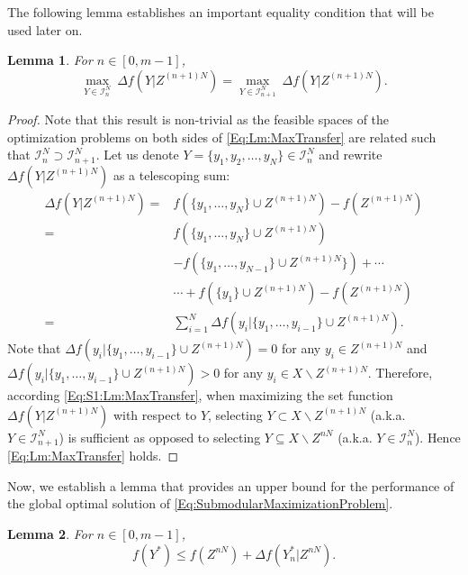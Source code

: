 \documentclass[letterpaper, 10 pt, conference]{ieeeconf}
\newtheorem{lemma}{Lemma}
\begin{document}
{%
The following lemma establishes an important equality condition that will be used later on. 
\begin{lemma}\label{Lm:MaxTransfer}
For $n\in [0,m-1]$,
\begin{equation} \label{Eq:Lm:MaxTransfer}
\underset{Y\in\mathcal{I}^N_n}{\max}\ \Delta f(Y\vert Z^{(n+1)N}) = \underset{Y\in\mathcal{I}^N_{n+1}}{\max}\ \Delta f(Y\vert Z^{(n+1)N}).    
\end{equation}
\end{lemma}
\begin{proof}
Note that this result is non-trivial as the feasible spaces of the optimization problems on both sides of \eqref{Eq:Lm:MaxTransfer} are related such that $\mathcal{I}^N_n \supset \mathcal{I}^N_{n+1}$. Let us denote $Y=\{y_1,y_2,\ldots,y_N\}\in \mathcal{I}^N_{n}$ and rewrite $\Delta f(Y\vert Z^{(n+1)N})$ as a telescoping sum:
\begin{align}
    \Delta f(Y\vert Z^{(n+1)N})
    =& f(\{y_1,\ldots,y_N\} \cup Z^{(n+1)N}) - f(Z^{(n+1)N}) \nonumber \\
    =& f(\{y_1,\ldots,y_N\} \cup Z^{(n+1)N}) \nonumber \\
    &- f(\{y_1,\ldots,y_{N-1}\} \cup Z^{(n+1)N}\})+\cdots       \nonumber \\
    &\cdots + f(\{y_1\} \cup Z^{(n+1)N}) - f(Z^{(n+1)N}) \nonumber \\
    =& \sum_{i=1}^N \Delta f(y_i\vert \{y_1,\ldots,y_{i-1}\} \cup Z^{(n+1)N}).\label{Eq:S1:Lm:MaxTransfer}
\end{align}
Note that $\Delta f(y_i\vert \{y_1,\ldots,y_{i-1}\} \cup Z^{(n+1)N}) = 0$ for any $y_i \in Z^{(n+1)N}$ and $\Delta f(y_i\vert \{y_1,\ldots,y_{i-1}\} \cup Z^{(n+1)N}) > 0$ for any $y_i\in X\backslash Z^{(n+1)N}$. Therefore, according \eqref{Eq:S1:Lm:MaxTransfer}, when maximizing the set function $\Delta f(Y\vert Z^{(n+1)N})$ with respect to $Y$, selecting $Y \subset X\backslash Z^{(n+1)N}$ (a.k.a. $Y\in \mathcal{I}^N_{n+1}$) is sufficient as opposed to selecting $Y\subseteq X\backslash Z^{nN}$ (a.k.a. $Y\in\mathcal{I}^N_n$). Hence \eqref{Eq:Lm:MaxTransfer} holds.
\end{proof}

Now, we establish a lemma that provides an upper bound for the performance of the global optimal solution of \eqref{Eq:SubmodularMaximizationProblem}.




\begin{lemma}\label{Lm:UpperBoundForfYStar}
For $n\in[0,m-1]$,
\begin{equation}\label{Eq:Lm:UpperBoundForfYStar}
f(Y^*) \leq f(Z^{nN}) + \Delta f(Y^*_n \vert Z^{nN}).    
\end{equation}
\end{lemma}

}
\end{document}
